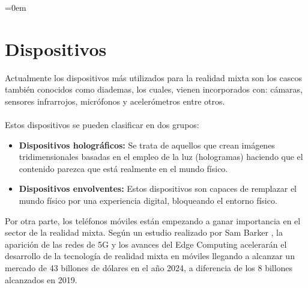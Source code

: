 \parindent=0em
\section{Dispositivos}
\noindent


Actualmente los dispositivos más utilizados para la realidad mixta son los cascos también conocidos como diademas, los cuales, vienen incorporados con: cámaras, sensores infrarrojos, micrófonos y acelerómetros entre otros. \\\\Estos dispositivos se pueden clasificar en dos grupos:

\begin{itemize}
    \item \textbf{Dispositivos holográficos:} Se trata de aquellos que crean imágenes tridimensionales basadas en el empleo de la luz (hologramas) haciendo que el contenido parezca que está realmente en el mundo físico.
    
    \item \textbf{Dispositivos envolventes:} Estos dispositivos son capaces de remplazar el mundo físico por una experiencia digital, bloqueando el entorno físico.
    
\end{itemize}

Por otra parte, los teléfonos móviles están empezando a ganar importancia en el sector de la realidad mixta. Según un estudio realizado por Sam Barker \cite{juniperArMrmoney} , la aparición de las redes de  5G y los avances del Edge Computing acelerarán el desarrollo de la tecnología de realidad mixta en móviles llegando a alcanzar un mercado de 43 billones de dólares en el año 2024, a diferencia de los 8 billones alcanzados en 2019.




